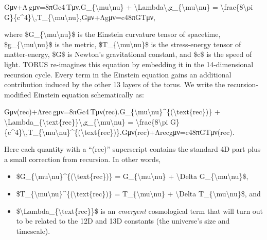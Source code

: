 \documentclass[
]{article}
\begin{document}
Gμν+Λ gμν=8πGc4 Tμν,G\_\{\textbackslash mu\textbackslash nu\} +
\textbackslash Lambda\textbackslash,g\_\{\textbackslash mu\textbackslash nu\}
= \textbackslash frac\{8\textbackslash pi
G\}\{c\^{}4\}\textbackslash,T\_\{\textbackslash mu\textbackslash nu\},Gμν\hspace{0pt}+Λgμν\hspace{0pt}=c48πG\hspace{0pt}Tμν\hspace{0pt},

where \$G\_\{\textbackslash mu\textbackslash nu\}\$ is the Einstein
curvature tensor of spacetime,
\$g\_\{\textbackslash mu\textbackslash nu\}\$ is the metric,
\$T\_\{\textbackslash mu\textbackslash nu\}\$ is the stress-energy
tensor of matter-energy, \$G\$ is Newton's gravitational constant, and
\$c\$ is the speed of light. TORUS re-imagines this equation by
embedding it in the 14-dimensional recursion cycle. Every term in the
Einstein equation gains an additional contribution induced by the other
13 layers of the torus. We write the recursion-modified Einstein
equation schematically as:

Gμν(rec)+Λrec gμν=8πGc4 Tμν(rec).G\_\{\textbackslash mu\textbackslash nu\}\^{}\{(\textbackslash text\{rec\})\}
+
\textbackslash Lambda\_\{\textbackslash text\{rec\}\}\textbackslash,g\_\{\textbackslash mu\textbackslash nu\}
= \textbackslash frac\{8\textbackslash pi
G\}\{c\^{}4\}\textbackslash,T\_\{\textbackslash mu\textbackslash nu\}\^{}\{(\textbackslash text\{rec\})\}.Gμν(rec)\hspace{0pt}+Λrec\hspace{0pt}gμν\hspace{0pt}=c48πG\hspace{0pt}Tμν(rec)\hspace{0pt}.

Here each quantity with a ``(rec)'' superscript contains the standard 4D
part plus a small correction from recursion. In other words,

\begin{itemize}
\item
  \$G\_\{\textbackslash mu\textbackslash nu\}\^{}\{(\textbackslash text\{rec\})\}
  = G\_\{\textbackslash mu\textbackslash nu\} + \textbackslash Delta
  G\_\{\textbackslash mu\textbackslash nu\}\$,
\item
  \$T\_\{\textbackslash mu\textbackslash nu\}\^{}\{(\textbackslash text\{rec\})\}
  = T\_\{\textbackslash mu\textbackslash nu\} + \textbackslash Delta
  T\_\{\textbackslash mu\textbackslash nu\}\$, and
\item
  \$\textbackslash Lambda\_\{\textbackslash text\{rec\}\}\$ is an
  \emph{emergent} cosmological term that will turn out to be related to
  the 12D and 13D constants (the universe's size and timescale).
\end{itemize}
\end{document}
